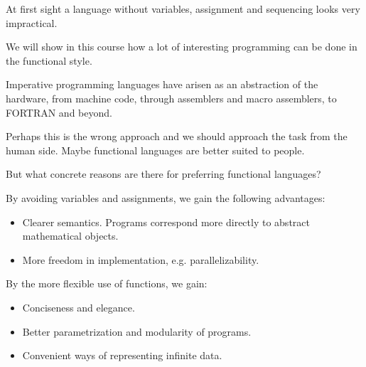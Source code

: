 \begin{slide*}


\vspace*{0.5cm}

At first sight a language without variables, assignment and sequencing looks
very impractical.

We will show in this course how a lot of interesting programming can be done in
the functional style.

Imperative programming languages have arisen as an abstraction of the hardware,
from machine code, through assemblers and macro assemblers, to FORTRAN and
beyond.

Perhaps this is the wrong approach and we should approach the task from the
human side. Maybe functional languages are better suited to people.

But what concrete reasons are there for preferring functional languages?

\end{slide*}



\begin{slide*}


\vspace*{1.0cm}

By avoiding variables and assignments, we gain the following advantages:

\begin{itemize}

\item Clearer semantics. Programs correspond more directly to abstract
mathematical objects.

\item More freedom in implementation, e.g. parallelizability.

\end{itemize}

By the more flexible use of functions, we gain:

\begin{itemize}

\item Conciseness and elegance.

\item Better parametrization and modularity of programs.

\item Convenient ways of representing infinite data.

\end{itemize}

\end{slide*}


